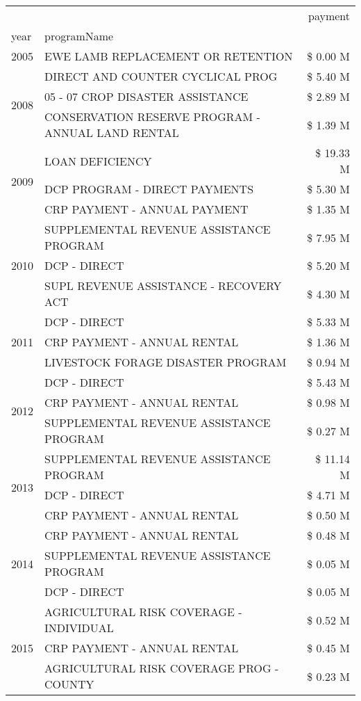 \begin{tabular}{llr}
\toprule
 &  & payment \\
year & programName &  \\
\midrule
2005 & EWE LAMB REPLACEMENT OR RETENTION & \$ 0.00 M \\
\cline{1-3}
\multirow[t]{3}{*}{2008} & DIRECT AND COUNTER CYCLICAL PROG & \$ 5.40 M \\
 & 05 - 07 CROP DISASTER ASSISTANCE & \$ 2.89 M \\
 & CONSERVATION RESERVE PROGRAM - ANNUAL LAND RENTAL & \$ 1.39 M \\
\cline{1-3}
\multirow[t]{3}{*}{2009} & LOAN DEFICIENCY & \$ 19.33 M \\
 & DCP PROGRAM - DIRECT PAYMENTS & \$ 5.30 M \\
 & CRP PAYMENT - ANNUAL PAYMENT & \$ 1.35 M \\
\cline{1-3}
\multirow[t]{3}{*}{2010} & SUPPLEMENTAL REVENUE ASSISTANCE PROGRAM & \$ 7.95 M \\
 & DCP - DIRECT & \$ 5.20 M \\
 & SUPL REVENUE ASSISTANCE - RECOVERY ACT & \$ 4.30 M \\
\cline{1-3}
\multirow[t]{3}{*}{2011} & DCP - DIRECT & \$ 5.33 M \\
 & CRP PAYMENT - ANNUAL RENTAL & \$ 1.36 M \\
 & LIVESTOCK FORAGE DISASTER PROGRAM & \$ 0.94 M \\
\cline{1-3}
\multirow[t]{3}{*}{2012} & DCP - DIRECT & \$ 5.43 M \\
 & CRP PAYMENT - ANNUAL RENTAL & \$ 0.98 M \\
 & SUPPLEMENTAL REVENUE ASSISTANCE PROGRAM & \$ 0.27 M \\
\cline{1-3}
\multirow[t]{3}{*}{2013} & SUPPLEMENTAL REVENUE ASSISTANCE PROGRAM & \$ 11.14 M \\
 & DCP - DIRECT & \$ 4.71 M \\
 & CRP PAYMENT - ANNUAL RENTAL & \$ 0.50 M \\
\cline{1-3}
\multirow[t]{3}{*}{2014} & CRP PAYMENT - ANNUAL RENTAL & \$ 0.48 M \\
 & SUPPLEMENTAL REVENUE ASSISTANCE PROGRAM & \$ 0.05 M \\
 & DCP - DIRECT & \$ 0.05 M \\
\cline{1-3}
\multirow[t]{3}{*}{2015} & AGRICULTURAL RISK COVERAGE - INDIVIDUAL & \$ 0.52 M \\
 & CRP PAYMENT - ANNUAL RENTAL & \$ 0.45 M \\
 & AGRICULTURAL RISK COVERAGE PROG - COUNTY & \$ 0.23 M \\

\end{tabular}
